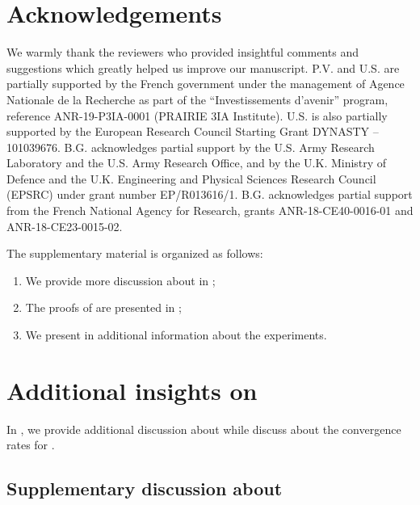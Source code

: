 \documentclass{article}
\begin{document}
\section{Acknowledgements}

We warmly thank the reviewers who provided insightful comments and suggestions which greatly helped us improve our manuscript.
P.V. and U.S. are partially supported by the French government under the management of Agence Nationale de la Recherche as part of the ``Investissements d’avenir'' program, reference ANR-19-P3IA-0001 (PRAIRIE 3IA Institute).
U.S. is also partially supported by the European Research Council Starting Grant DYNASTY – 101039676.
B.G. acknowledges partial support by the U.S. Army Research Laboratory and the U.S. Army Research Office, and by the U.K. Ministry of Defence and the U.K. Engineering and Physical Sciences Research Council (EPSRC) under grant number EP/R013616/1.
B.G. acknowledges partial support from the French National Agency for Research, grants ANR-18-CE40-0016-01 and ANR-18-CE23-0015-02.




\newpage

\appendix

The supplementary material is organized as follows:
\begin{enumerate}[label={\it (\roman*)}]
    \item We provide more discussion about  in ;
    \item The proofs of  are presented in ;
    \item We present in  additional information about the experiments.
\end{enumerate}

\section{Additional insights on }
\label{sec:discussion-supervised}

In , we provide additional discussion about  while  discuss about the convergence rates for .

\subsection{Supplementary discussion about }
\label{sec:discussion-supervised-ht}
\end{document}
